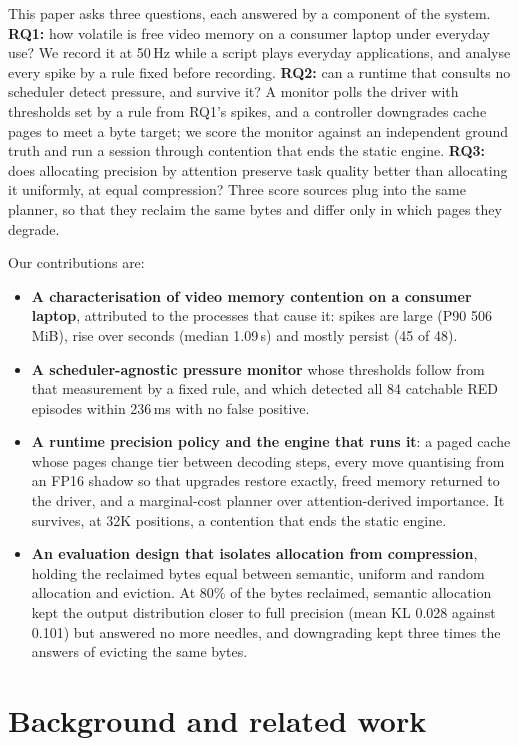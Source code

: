 \documentclass{article}
\begin{document}
This paper asks three questions, each answered by a component of the system.
\textbf{RQ1:} how volatile is free video memory on a consumer laptop under
everyday use? We record it at 50\,Hz while a script plays everyday
applications, and analyse every spike by a rule fixed before recording.
\textbf{RQ2:} can a runtime that consults no scheduler detect pressure, and
survive it? A monitor polls the driver with thresholds set by a rule from RQ1's
spikes, and a controller downgrades cache pages to meet a byte target; we score
the monitor against an independent ground truth and run a session through
contention that ends the static engine. \textbf{RQ3:} does allocating
precision by attention preserve task quality better than allocating it
uniformly, at equal compression? Three score sources plug into the same
planner, so that they reclaim the same bytes and differ only in which pages they
degrade.

Our contributions are:
\begin{itemize}
\item \textbf{A characterisation of video memory contention on a consumer
laptop}, attributed to the processes that cause it: spikes are large (P90
506\,MiB), rise over seconds (median 1.09\,s) and mostly persist (45 of 48).
\item \textbf{A scheduler-agnostic pressure monitor} whose thresholds follow
from that measurement by a fixed rule, and which detected all 84 catchable RED
episodes within 236\,ms with no false positive.
\item \textbf{A runtime precision policy and the engine that runs it}: a paged
cache whose pages change tier between decoding steps, every move quantising
from an FP16 shadow so that upgrades restore exactly, freed memory returned to
the driver, and a marginal-cost planner over attention-derived importance. It
survives, at 32K positions, a contention that ends the static engine.
\item \textbf{An evaluation design that isolates allocation from compression},
holding the reclaimed bytes equal between semantic, uniform and random
allocation and eviction. At 80\% of the bytes reclaimed, semantic allocation
kept the output distribution closer to full precision (mean KL 0.028 against
0.101) but answered no more needles, and downgrading kept three times the
answers of evicting the same bytes.
\end{itemize}

\section{Background and related work}
\label{sec:related}
\end{document}
